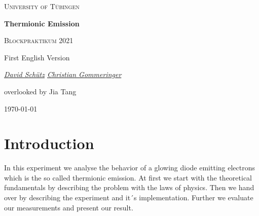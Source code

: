 \documentclass[a4paper, 12pt]{scrartcl}
\begin{document}
\begin{titlepage}
	\centering
	{\scshape\LARGE University of Tübingen \par}
	\vspace{2cm}
	{\huge\bfseries Thermionic Emission \par}
	\vspace{2cm}
	{\Large \scshape Blockpraktikum 2021} \par
	\vspace{2cm}
	{\Large  First English Version} \par
	\vspace{2cm}
	{\Large\itshape \underline{David Schütz} \space \space  \underline{Christian Gommeringer}\par}
	\vfill 
	{\large overlooked by Jia Tang}
	\vfill

	{\large \today\par}
\end{titlepage}
\newpage 
\tableofcontents 

\newpage
\section{Introduction} 
In this experiment we analyse the behavior of a glowing diode emitting electrons which is the so called thermionic emission. At first we start with the theoretical fundamentals by describing the problem with the laws of physics. Then we hand over by describing the experiment and it´s implementation. Further we evaluate our measurements and present our result. 
\newline 
\newline 
\end{document}
